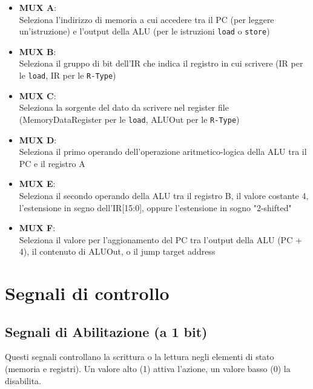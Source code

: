 \begin{itemize}
    \item \textbf{MUX A}: \\
        Seleziona l'indirizzo di memoria a cui accedere tra il PC (per leggere un'istruzione) e l'output della ALU (per le istruzioni \texttt{load} o \texttt{store})

    \item \textbf{MUX B}: \\
        Seleziona il gruppo di bit dell'IR che indica il registro in cui scrivere (IR per le \texttt{load}, IR per le \texttt{R-Type})

    \item \textbf{MUX C}: \\
        Seleziona la sorgente del dato da scrivere nel register file (MemoryDataRegister per le \texttt{load}, ALUOut per le \texttt{R-Type})

    \item \textbf{MUX D}: \\
        Seleziona il primo operando dell'operazione aritmetico-logica della ALU tra il PC e il registro A

    \item \textbf{MUX E}: \\
        Seleziona il secondo operando della ALU tra il registro B, il valore costante 4, l'estensione in segno dell'IR[15:0], oppure l'estensione in sogno "2-shifted"

    \item \textbf{MUX F}: \\
        Seleziona il valore per l'aggionamento del PC tra l'output della ALU (PC + 4), il contenuto di ALUOut, o il jump target address
\end{itemize}

\section{Segnali di controllo}

\subsection{Segnali di Abilitazione (a 1 bit)}
Questi segnali controllano la scrittura o la lettura negli elementi di stato (memoria e registri). Un valore alto (1) attiva l'azione, un valore basso (0) la disabilita.

